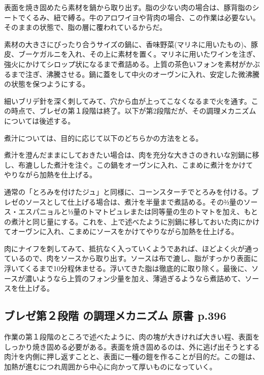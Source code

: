 表面を焼き固めたら素材を鍋から取り出す。脂の少ない肉の場合は、豚背脂のシートでくるみ、紐で縛る。牛のアロワイヨや背肉の場合、この作業は必要ない。そのままの状態で、脂の層に覆われているからだ。

素材の大きさにぴったり合うサイズの鍋に、香味野菜(マリネに用いたもの)、豚皮、ブーケガルニを入れ、その上に素材を置く。マリネに用いたワインを注ぎ、強火にかけてシロップ状になるまで煮詰める。上質の茶色いフォンを素材がかぶるまで注ぎ、沸騰させる。鍋に蓋をして中火のオーヴンに入れ、安定した微沸騰の状態を保つようにする。

細いブリデ針を深く刺してみて、穴から血が上ってこなくなるまで火を通す。この時点で、ブレゼの第１段階は終了。以下が第2段階だが、その調理メカニズムについては後述する。

煮汁については、目的に応じて以下のどちらかの方法をとる。

煮汁を澄んだままにしておきたい場合は、肉を充分な大きさのきれいな別鍋に移し、布漉しした煮汁を注ぐ。この鍋をオーヴンに入れ、こまめに煮汁をかけてやりながら加熱を仕上げる。

通常の「とろみを付けたジュ」と同様に、コーンスターチでとろみを付ける。ブレゼのソースとして仕上げる場合は、煮汁を半量まで煮詰める。その⅔量のソース・エスパニョルと⅓量のトマトピュレまたは同等量の生のトマトを加え、もとの煮汁と同じ量にする。これを、上で述べたように別鍋に移しておいた肉にかけてオーヴンに入れ、こまめにソースをかけてやりながら加熱を仕上げる。

肉にナイフを刺してみて、抵抗なく入っていくようであれば、ほどよく火が通っているので、肉をソースから取り出す。ソースは布で漉し、脂がすっかり表面に浮いてくるまで10分程休ませる。浮いてきた脂は徹底的に取り除く。最後に、ソースが濃いようなら上質のフォン少量を加え、薄過ぎるようなら煮詰めて、ソースを仕上げる。

\hypertarget{ux30d6ux30ecux30bcux7b2cux6bb5ux968e-ux306eux8abfux7406ux30e1ux30abux30cbux30baux30e0-ux539fux66f8-p.396}{%
\subsection{ブレゼ第２段階 の調理メカニズム 原書
p.396}\label{ux30d6ux30ecux30bcux7b2cux6bb5ux968e-ux306eux8abfux7406ux30e1ux30abux30cbux30baux30e0-ux539fux66f8-p.396}}

作業の第１段階のところで述べたように、肉の塊が大きければ大きい程、表面をしっかり焼き固める必要がある。表面を焼き固めるのは、外に逃げ出そうとする肉汁を内側に押し返すことと、表面に一種の鎧を作ることが目的だ。この鎧は、加熱が進むにつれ周囲から中心に向かって厚いものになっていく。

